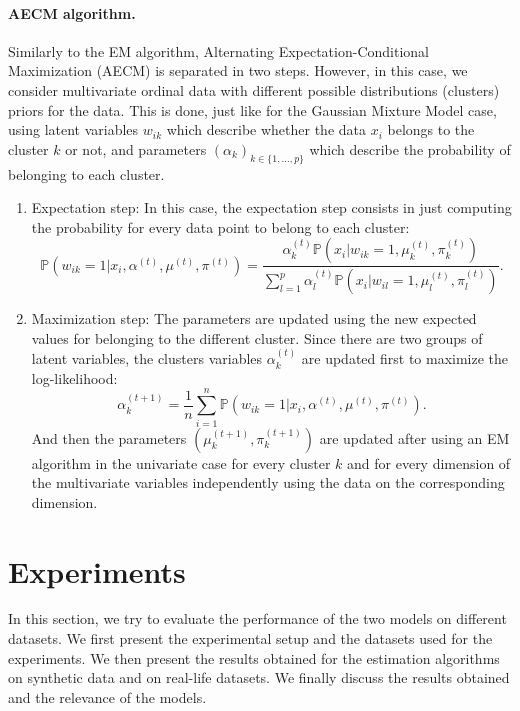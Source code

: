 \documentclass[a4paper,12pt]{article}
\begin{document}
\paragraph{AECM algorithm.} Similarly to the EM algorithm, Alternating Expectation-Conditional Maximization (AECM) \citep{meng1997algorithm} is separated in two steps. However, in this case, we consider multivariate ordinal data with different possible distributions (clusters) priors for the data. This is done, just like for the Gaussian Mixture Model case, using latent variables $w_{ik}$ which describe whether the data $x_i$ belongs to the cluster $k$ or not, and parameters $(\alpha_k)_{k\in \{1, \ldots, p\}}$ which describe the probability of belonging to each cluster. 
\begin{enumerate}
    \item Expectation step: In this case, the expectation step consists in just computing the probability for every data point to belong to each cluster:
    \begin{equation}
        \mathbb{P}(w_{ik}=1|x_i, \alpha^{(t)}, \mu^{(t)}, \pi^{(t)}) = \frac{\alpha_k^{(t)}\mathbb{P}(x_i|w_{ik}=1, \mu_k^{(t)}, \pi_k^{(t)})}{\sum_{l=1}^p\alpha_l^{(t)}\mathbb{P}(x_i|w_{il}=1, \mu_l^{(t)}, \pi_l^{(t)})}.
    \end{equation}
    \item Maximization step: The parameters are updated using the new expected values for belonging to the different cluster. Since there are two groups of latent variables, the clusters variables $\alpha_k^{(t)}$ are updated first to maximize the log-likelihood:
    \begin{equation}
    \alpha_k^{(t+1)} = \frac{1}{n} \sum_{i=1}^n \mathbb{P}(w_{ik}=1|x_i, \alpha^{(t)}, \mu^{(t)}, \pi^{(t)}).
    \end{equation}
    And then the parameters $(\mu_k^{(t+1)}, \pi_k^{(t+1)})$ are updated after using an EM algorithm in the univariate case for every cluster $k$ and for every dimension of the multivariate variables independently using the data on the corresponding dimension.
\end{enumerate}



\section{Experiments}
In this section, we try to evaluate the performance of the two models on different datasets. We first present the experimental setup and the datasets used for the experiments. We then present the results obtained for the estimation algorithms on synthetic data and on real-life datasets. We finally discuss the results obtained and the relevance of the models. 
\end{document}

